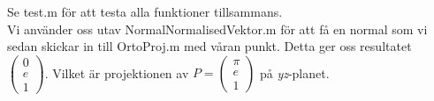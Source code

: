 Se test.m för att testa alla funktioner tillsammans.\\
Vi använder oss utav NormalNormalisedVektor.m för att få en normal som vi sedan skickar in till OrtoProj.m med våran punkt.
Detta ger oss resultatet $\begin{pmatrix}0\\e\\1\end{pmatrix}$. 
Vilket är projektionen av $P = \begin{pmatrix}\pi\\e\\1\end{pmatrix}$ på \emph{yz}-planet.